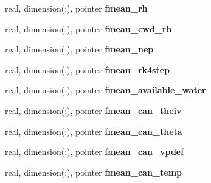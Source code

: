 \begin{DoxyCompactItemize}
\item 
\hypertarget{structed__state__vars_1_1edtype_a5bc940fdb7de43635d45667886a16327}{
real, dimension(:), pointer {\bfseries fmean\_\-rh}}
\label{structed__state__vars_1_1edtype_a5bc940fdb7de43635d45667886a16327}

\item 
\hypertarget{structed__state__vars_1_1edtype_acc3a8ef8039b46dade5d14f79cac5eec}{
real, dimension(:), pointer {\bfseries fmean\_\-cwd\_\-rh}}
\label{structed__state__vars_1_1edtype_acc3a8ef8039b46dade5d14f79cac5eec}

\item 
\hypertarget{structed__state__vars_1_1edtype_a7474949a66f15ae57381c16754bf95e7}{
real, dimension(:), pointer {\bfseries fmean\_\-nep}}
\label{structed__state__vars_1_1edtype_a7474949a66f15ae57381c16754bf95e7}

\item 
\hypertarget{structed__state__vars_1_1edtype_aaecf4b2c0c3e8e54a4b0c323b0e953ee}{
real, dimension(:), pointer {\bfseries fmean\_\-rk4step}}
\label{structed__state__vars_1_1edtype_aaecf4b2c0c3e8e54a4b0c323b0e953ee}

\item 
\hypertarget{structed__state__vars_1_1edtype_ad684478427395cf64835d1e037af2b65}{
real, dimension(:), pointer {\bfseries fmean\_\-available\_\-water}}
\label{structed__state__vars_1_1edtype_ad684478427395cf64835d1e037af2b65}

\item 
\hypertarget{structed__state__vars_1_1edtype_ac34b4d52d4583b3ef414f43f35bdcb24}{
real, dimension(:), pointer {\bfseries fmean\_\-can\_\-theiv}}
\label{structed__state__vars_1_1edtype_ac34b4d52d4583b3ef414f43f35bdcb24}

\item 
\hypertarget{structed__state__vars_1_1edtype_ac0f5e5729c55c176d9ac1bd4844ae6a2}{
real, dimension(:), pointer {\bfseries fmean\_\-can\_\-theta}}
\label{structed__state__vars_1_1edtype_ac0f5e5729c55c176d9ac1bd4844ae6a2}

\item 
\hypertarget{structed__state__vars_1_1edtype_a3a9af606c6f878323b485c2fd473c6ec}{
real, dimension(:), pointer {\bfseries fmean\_\-can\_\-vpdef}}
\label{structed__state__vars_1_1edtype_a3a9af606c6f878323b485c2fd473c6ec}

\item 
\hypertarget{structed__state__vars_1_1edtype_aec47f978d286b03298708f9f0abdf6a7}{
real, dimension(:), pointer {\bfseries fmean\_\-can\_\-temp}}
\label{structed__state__vars_1_1edtype_aec47f978d286b03298708f9f0abdf6a7}


\end{DoxyCompactItemize}
